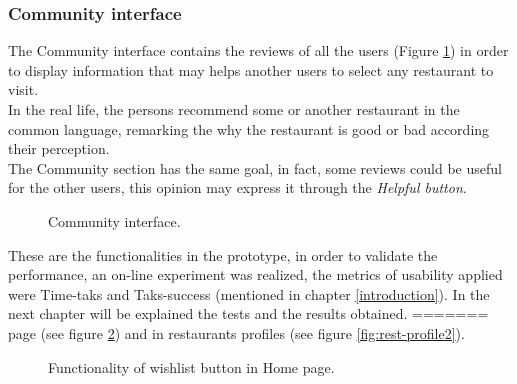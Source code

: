 \subsubsection{Community interface}

The Community interface contains the reviews of all the users  
(Figure  \ref{fig:community}) in order to display information that may helps
another users to select any restaurant to visit. \\In the real life, the
persons recommend some or another restaurant in the common  language,
remarking the why the restaurant is good or bad according  their
perception. \\The Community section has the same goal, in fact,  some
reviews could be useful for the other users, this opinion may  express
it through the \textit{Helpful button}.
\begin{figure}
\captionsetup{font=footnotesize}
\centering
{}
\caption{Community interface.}
\label{fig:community}   
\end{figure}
These are the functionalities in the prototype, in order to validate
the performance, an on-line experiment was realized, the metrics 
of usability applied were Time-taks and Taks-success (mentioned 
in chapter  \ref{introduction}). In the next chapter will be 
explained the tests and the results obtained.
=======
page (see figure \ref{fig:wishlist-home}) and in restaurants 
profiles (see figure \ref{fig:rest-profile2}).
\begin{figure}
\captionsetup{font=footnotesize}
\centering
{}
\caption{Functionality of wishlist button in Home page.}
\label{fig:wishlist-home}   
\end{figure}
